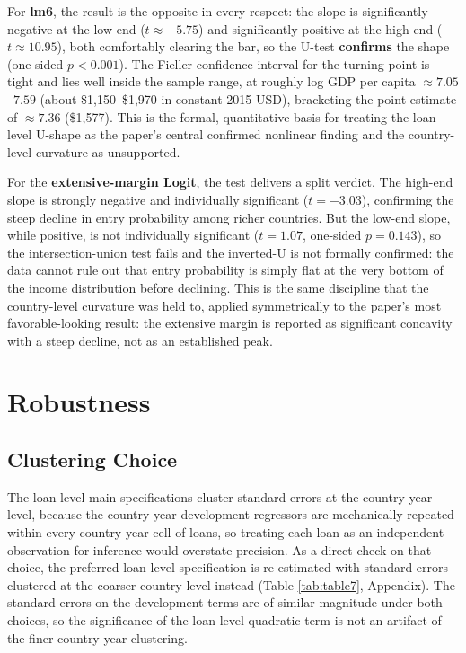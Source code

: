 \documentclass[12pt]{article}
\begin{document}
For \textbf{lm6}, the result is the opposite in every respect: the slope is significantly negative at
the low end ($t\approx-5.75$) and significantly positive at the high end ($t\approx10.95$), both
comfortably clearing the bar, so the U-test \textbf{confirms} the shape (one-sided $p<0.001$). The
Fieller confidence interval for the turning point is tight and lies well inside the sample range, at
roughly log GDP per capita $\approx7.05$--$7.59$ (about \$1,150--\$1,970 in constant 2015 USD),
bracketing the point estimate of $\approx7.36$ (\$1,577). This is the formal, quantitative basis for
treating the loan-level U-shape as the paper's central confirmed nonlinear finding and the
country-level curvature as unsupported.

For the \textbf{extensive-margin Logit}, the test delivers a split verdict. The high-end slope is
strongly negative and individually significant ($t=-3.03$), confirming the steep decline in entry
probability among richer countries. But the low-end slope, while positive, is not individually
significant ($t=1.07$, one-sided $p=0.143$), so the intersection-union test fails and the inverted-U is
not formally confirmed: the data cannot rule out that entry probability is simply flat at the very
bottom of the income distribution before declining. This is the same discipline that the country-level
curvature was held to, applied symmetrically to the paper's most favorable-looking result: the
extensive margin is reported as significant concavity with a steep decline, not as an established
peak.

\section{Robustness}
\label{sec:robustness}

\subsection{Clustering Choice}

The loan-level main specifications cluster standard errors at the country-year level, because the
country-year development regressors are mechanically repeated within every country-year cell of loans,
so treating each loan as an independent observation for inference would overstate precision. As a
direct check on that choice, the preferred loan-level specification is re-estimated with standard
errors clustered at the coarser country level instead (Table \ref{tab:table7}, Appendix). The standard
errors on the development terms are of similar magnitude under both choices, so the significance of the
loan-level quadratic term is not an artifact of the finer country-year clustering.
\end{document}
